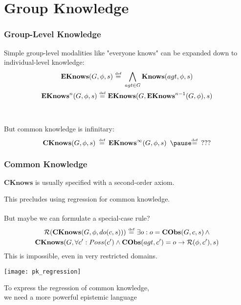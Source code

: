 \documentclass[compress]{beamer}
\newcommand{\isdef}{\hbox{$\stackrel{\mbox{\tiny def}}{=}$}}
\newcommand{\Reg}{\mathcal{R}}
\newcommand{\EKnows}{\mathbf{EKnows}}
\newcommand{\Knows}{\mathbf{Knows}}
\newcommand{\CKnows}{\mathbf{CKnows}}
\begin{document}
\section{Group Knowledge}

\begin{frame}
\frametitle{Group-Level Knowledge}
Simple group-level modalities like "everyone knows" can be expanded down to individual-level knowledge:
\begin{gather*}
\EKnows(G,\phi,s)\,\,\isdef\,\,\bigwedge_{agt \in G} \Knows(agt,\phi,s)\\
\EKnows^{n}(G,\phi,s)\,\,\isdef\,\,\EKnows(G,\EKnows^{n-1}(G,\phi),s)
\end{gather*}
\ \\
\ \\
\pause
But common knowledge is infinitary:
\begin{equation*}
\CKnows(G,\phi,s)\,\,\,\isdef\,\,\,\EKnows^{\infty}(G,\phi,s)\,\,\,\pause \isdef\,\,\,???
\end{equation*}
\end{frame}

\begin{frame}
\frametitle{Common Knowledge}
$\CKnows$ is usually specified with a second-order axiom.

This precludes using regression for common knowledge.
\ \\
\ \\
\pause
But maybe we can formulate a special-case rule?
\begin{multline*}
\Reg(\CKnows(G,\phi,do(c,s)))\,\,\isdef\,\,\exists o: o = \mathbf{CObs}(G,c,s)\,\wedge \\
  \CKnows(G,\forall c': Poss(c')\wedge \mathbf{CObs}(agt,c')=o \rightarrow \Reg(\phi,c'),s)
\end{multline*}
\pause
This is \alert{impossible}, even in very restricted domains.
\end{frame}

\begin{frame}
\begin{center}
  \texttt{[image: pk\_regression]}
\end{center}
\end{frame}

\begin{frame}
\centering To express the regression of common knowledge,\\
we need a more powerful epistemic language \\
\end{frame}
\end{document}

